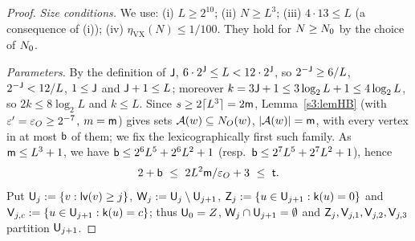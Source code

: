 \begin{proof}
\emph{Size conditions.} We use: (i) $L\ge2^{10}$; (ii) $N\ge L^3$; (iii) $4\cdot13\le L$ (a consequence of (i)); (iv)
$\eta_{\mathrm{VX}}(N)\le1/100$. They hold for $N\ge N_{0}$ by the choice of $N_{0}$.

\emph{Parameters.} By the definition of $\mathsf{J}$, $6\cdot2^{\mathsf{J}}\le L<12\cdot2^{\mathsf{J}}$, so $2^{-\mathsf{J}}\ge6/L$,
$2^{-\mathsf{J}}<12/L$, $1\le\mathsf{J}$ and $\mathsf{J}+1\le L$; moreover $k=3\mathsf{J}+1\le3\log_2L+1\le4\log_2L$, so $2k\le8\log_2L$ and
$k\le L$. Since $s\ge2\lceil L^3\rceil=2\mathsf{m}$, Lemma~\ref{s3:lemHB} (with $\varepsilon'=\varepsilon_O\ge2^{-7}$, $m=\mathsf{m}$) gives sets
$\mathcal{A}(w)\subseteq N_O(w)$, $|\mathcal{A}(w)|=\mathsf{m}$, with every vertex in at most $\mathsf{b}$ of them; we fix the lexicographically
first such family. As $\mathsf{m}\le L^3+1$, we have $\mathsf{b}\le2^6L^5+2^6L^2+1$ (resp.\ $\mathsf{b}\le2^7L^5+2^7L^2+1$), hence
\begin{equation}\label{s4:eqVXt}
2+\mathsf{b}\ \le\ 2L^2\mathsf{m}/\varepsilon_O+3\ \le\ \mathsf{t} .
\end{equation}
Put $\mathsf{U}_j:=\{v:\mathsf{lv}(v)\ge j\}$, $\mathsf{W}_j:=\mathsf{U}_j\setminus\mathsf{U}_{j+1}$, $\mathsf{Z}_j:=\{u\in\mathsf{U}_{j+1}:\mathsf{k}(u)=0\}$ and
$\mathsf{V}_{j,c}:=\{u\in\mathsf{U}_{j+1}:\mathsf{k}(u)=c\}$; thus $\mathsf{U}_0=Z$, $\mathsf{W}_j\cap\mathsf{U}_{j+1}=\emptyset$ and
$\mathsf{Z}_j,\mathsf{V}_{j,1},\mathsf{V}_{j,2},\mathsf{V}_{j,3}$ partition $\mathsf{U}_{j+1}$.


\end{proof}
